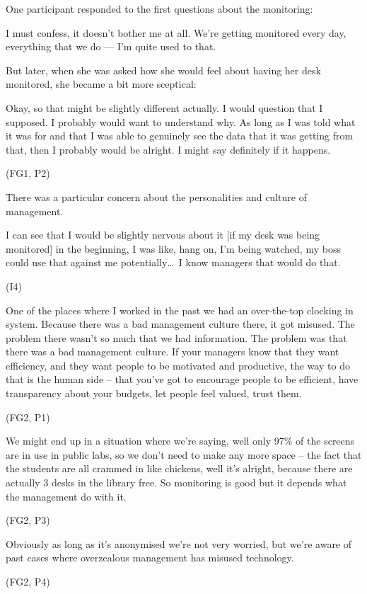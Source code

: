 One participant responded to the first questions about the monitoring:
 \begin{qt}I must confess, it doesn’t bother me at all. We’re getting monitored
every day, everything that we do --– I’m quite used to that.\end{qt}
But later,
when she was asked how she would feel about having her desk monitored,
she became a bit more sceptical: \begin{qt}Okay, so that might be slightly
different actually. I would question that I supposed. I probably would
want to understand why. As long as I was told what it was for and that
I was able to genuinely see the data that it was getting from that,
then I probably would be alright. I might say definitely if it
happens.\end{qt} (FG1, P2)

There was a particular concern about the personalities and culture of management.

\begin{qt}I can see that I would be slightly nervous about it [if my desk was
being monitored] in the beginning, I was like, hang on, I’m being
watched, my boss could use that against me potentially\ldots\  I know managers
that would do that.\end{qt} (I4)

\begin{qt}One of the places where I worked in the past we had an
  over-the-top clocking in system. Because there was a bad management
  culture there, it got misused. The problem there wasn’t so much that
  we had information. The problem was that there was a bad management
  culture. If your managers know that they want efficiency, and they
  want people to be motivated and productive, the way to do that is
  the human side – that you’ve got to encourage people to be
  efficient, have transparency about your budgets, let people feel
  valued, trust them.\end{qt} (FG2, P1) 

\begin{qt}We might end up in a situation where we’re saying, well only
  97\% of the screens are in use in public labs, so we don’t need to
  make any more space – the fact that the students are all crammed in
  like chickens, well it’s alright, because there are actually 3 desks
  in the library free. So monitoring is good but it depends what the
  management do with it.\end{qt} (FG2, P3) 
 
\begin{qt}Obviously as long as it’s anonymised we’re not very worried,
  but we’re aware of past cases where overzealous management has
  misused technology.\end{qt} (FG2, P4) 

